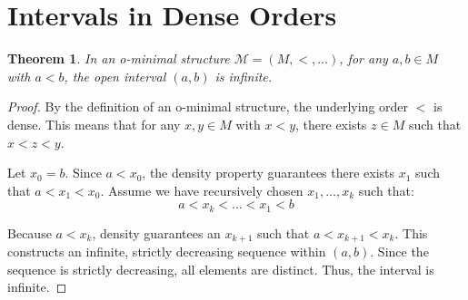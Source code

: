 \documentclass[12pt]{article}
\newtheorem{theorem}{Theorem}
\begin{document}
\section{Intervals in Dense Orders}
\begin{theorem}
In an o-minimal structure $\mathcal{M} = (M, <, \dots)$, for any $a, b \in M$ with $a < b$, the open interval $(a, b)$ is infinite.
\end{theorem}
\begin{proof}
By the definition of an o-minimal structure, the underlying order $<$ is dense. This means that for any $x, y \in M$ with $x < y$, there exists $z \in M$ such that $x < z < y$.

Let $x_0 = b$. Since $a < x_0$, the density property guarantees there exists $x_1$ such that $a < x_1 < x_0$. 
Assume we have recursively chosen $x_1, \dots, x_k$ such that:
\[ a < x_k < \dots < x_1 < b \]

Because $a < x_k$, density guarantees an $x_{k+1}$ such that $a < x_{k+1} < x_k$. This constructs an infinite, strictly decreasing sequence within $(a, b)$. Since the sequence is strictly decreasing, all elements are distinct. Thus, the interval is infinite.
\end{proof}
\end{document}
